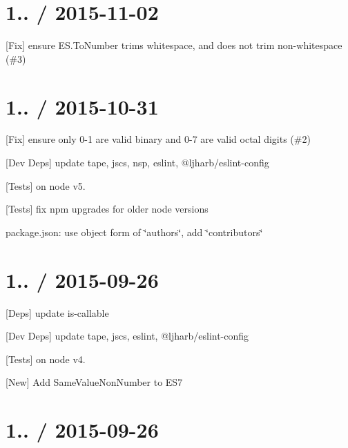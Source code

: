 \section*{1.. / 2015-\/11-\/02 }


\begin{DoxyItemize}
\item \mbox{[}Fix\mbox{]} ensure {\ttfamily E\+S.\+To\+Number} trims whitespace, and does not trim non-\/whitespace (\#3)
\end{DoxyItemize}

\section*{1.. / 2015-\/10-\/31 }


\begin{DoxyItemize}
\item \mbox{[}Fix\mbox{]} ensure only 0-\/1 are valid binary and 0-\/7 are valid octal digits (\#2)
\item \mbox{[}Dev Deps\mbox{]} update {\ttfamily tape}, {\ttfamily jscs}, {\ttfamily nsp}, {\ttfamily eslint}, {\ttfamily @ljharb/eslint-\/config}
\item \mbox{[}Tests\mbox{]} on {\ttfamily node} {\ttfamily v5.}
\item \mbox{[}Tests\mbox{]} fix npm upgrades for older node versions
\item package.\+json\+: use object form of \char`\"{}authors\char`\"{}, add \char`\"{}contributors\char`\"{}
\end{DoxyItemize}

\section*{1.. / 2015-\/09-\/26 }


\begin{DoxyItemize}
\item \mbox{[}Deps\mbox{]} update {\ttfamily is-\/callable}
\item \mbox{[}Dev Deps\mbox{]} update {\ttfamily tape}, {\ttfamily jscs}, {\ttfamily eslint}, {\ttfamily @ljharb/eslint-\/config}
\item \mbox{[}Tests\mbox{]} on {\ttfamily node} {\ttfamily v4.}
\item \mbox{[}New\mbox{]} Add {\ttfamily Same\+Value\+Non\+Number} to E\+S7
\end{DoxyItemize}

\section*{1.. / 2015-\/09-\/26 }


